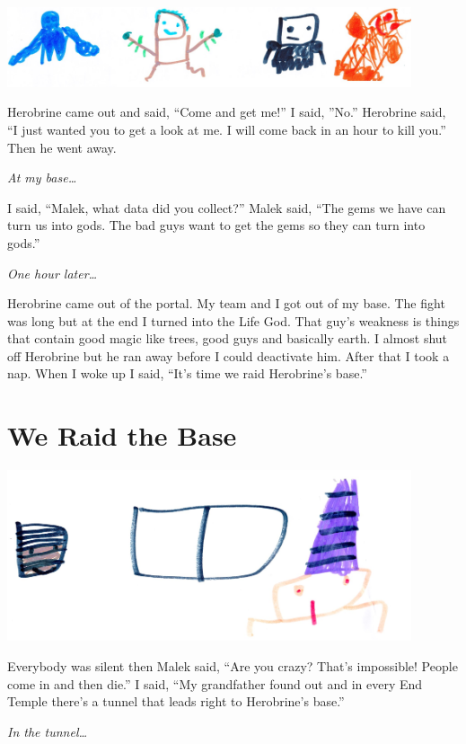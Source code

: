 \documentclass[12pt,twoside]{krantz}
\begin{document}
\includegraphics[width=4.6875in,height=\textheight]{img/herobrine-returns/3-gods.jpg}

Herobrine came out and said, ``Come and get me!'' I said, ''No.''
Herobrine said, ``I just wanted you to get a look at me. I will come
back in an hour to kill you.'' Then he went away.

\emph{At my base\ldots{}}

I said, ``Malek, what data did you collect?'' Malek said, ``The gems we
have can turn us into gods. The bad guys want to get the gems so they
can turn into gods.''

\emph{One hour later\ldots{}}

Herobrine came out of the portal. My team and I got out of my base. The
fight was long but at the end I turned into the Life God. That guy's
weakness is things that contain good magic like trees, good guys and
basically earth. I almost shut off Herobrine but he ran away before I
could deactivate him. After that I took a nap. When I woke up I said,
``It's time we raid Herobrine's base.''

\hypertarget{we-raid-the-base}{%
\section{We Raid the Base}\label{we-raid-the-base}}

\includegraphics[width=4.6875in,height=\textheight]{img/herobrine-returns/7-door.jpg}

Everybody was silent then Malek said, ``Are you crazy? That's
impossible! People come in and then die.'' I said, ``My grandfather
found out and in every End Temple there's a tunnel that leads right to
Herobrine's base.''

\emph{In the tunnel\ldots{}}
\end{document}
